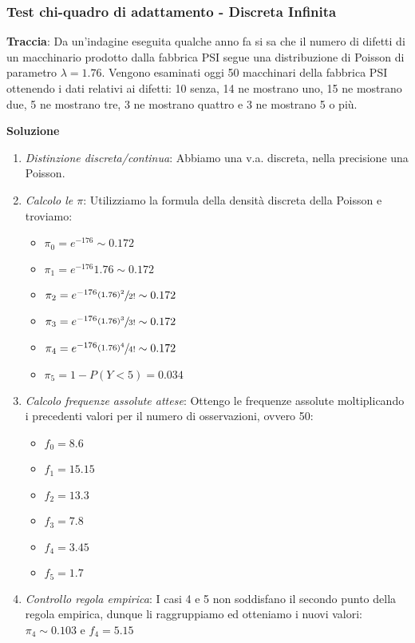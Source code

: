 \subsubsection{Test chi-quadro di adattamento - Discreta Infinita}

\textbf{Traccia}: Da un'indagine eseguita qualche anno fa si sa che il numero di difetti di un macchinario prodotto dalla fabbrica PSI segue una distribuzione di Poisson di parametro $\lambda=1.76$. Vengono esaminati oggi 50 macchinari della fabbrica PSI ottenendo i dati relativi ai difetti: 10 senza, 14 ne mostrano uno, 15 ne mostrano due, 5 ne mostrano tre, 3 ne mostrano quattro e 3 ne mostrano 5 o più.

\textbf{Soluzione}
\begin{enumerate}
    \item \textit{Distinzione discreta/continua}: Abbiamo una v.a. discreta, nella precisione una Poisson.
    \item \textit{Calcolo le $\pi$}: Utilizziamo la formula della densità discreta della Poisson e troviamo: 
    \begin{itemize}
        \item $\pi_0 = e^{-176} \sim 0.172$
        \item $\pi_1 = e^{-176} 1.76 \sim 0.172$
        \item $\pi_2 = e^{-176} \sfrac{(1.76)^2}{2!} \sim 0.172$
        \item $\pi_3 = e^{-176} \sfrac{(1.76)^3}{3!} \sim 0.172$
        \item $\pi_4 = e^{-176} \sfrac{(1.76)^4}{4!} \sim 0.172$
        \item $\pi_5 = 1 - P(Y < 5) = 0.034$
    \end{itemize}
    \item \textit{Calcolo frequenze assolute attese}: Ottengo le frequenze assolute moltiplicando i precedenti valori per il numero di osservazioni, ovvero 50:
    \begin{itemize}
        \item $f_0= 8.6$
        \item $f_1= 15.15$
        \item $f_2= 13.3$
        \item $f_3= 7.8$
        \item $f_4= 3.45$
        \item $f_5= 1.7$
    \end{itemize}
    \item \textit{Controllo regola empirica}: I casi 4 e 5 non soddisfano il secondo punto della regola empirica, dunque li raggruppiamo ed otteniamo i nuovi valori: $\pi_4 \sim 0.103$ e $f_4 = 5.15$

\end{enumerate}
